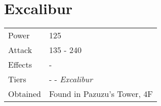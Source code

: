 \section{Excalibur}
\label{weapon:excalibur}


\noindent\begin{tabularx}{\textwidth}[l]{lX}
	Power
	& 125
\\ %
	Attack
	& 135 - 240
\\ %
	Effects
	& -
\\ %
	Tiers
	& \nameref{weapon:steel_sword} - \nameref{weapon:knights_sword} - \textit{Excalibur}
\\ %
	Obtained
	& Found in Pazuzu’s Tower, 4F
\end{tabularx}
